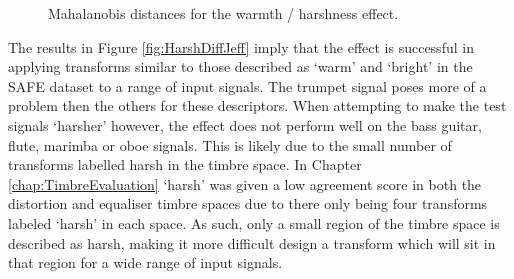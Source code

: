 			\begin{figure}[h!]
				\centering
				\quad
				\caption{Mahalanobis distances for the warmth / harshness effect.}
				\label{fig:HarshJeffs}
			\end{figure}

			The results in Figure \ref{fig:HarshDiffJeff} imply that the effect is successful in applying
			transforms similar to those described as `warm' and `bright' in the SAFE dataset to a range of input
			signals. The trumpet signal poses more of a problem then the others for these descriptors. When
			attempting to make the test signals `harsher' however, the effect does not perform well on the bass
			guitar, flute, marimba or oboe signals. This is likely due to the small number of transforms
			labelled harsh in the timbre space. In Chapter \ref{chap:TimbreEvaluation} `harsh' was given a low
			agreement score in both the distortion and equaliser timbre spaces due to there only being four
			transforms labeled `harsh' in each space. As such, only a small region of the timbre space is
			described as harsh, making it more difficult design a transform which will sit in that region for a
			wide range of input signals.

